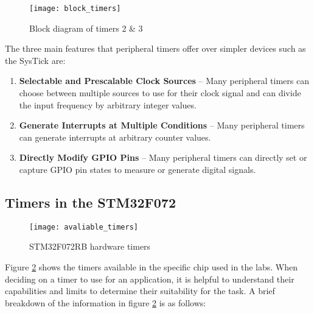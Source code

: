\documentclass[openany,11pt,fleqn]{book} %
\begin{document}
        \begin{figure}[]
            \centering\texttt{[image: block\_timers]}
            \caption{Block diagram of timers 2 \& 3}
            \label{block_timers}
        \end{figure}
        
        The three main features that peripheral timers offer over simpler devices such as the SysTick are:
        \begin{enumerate}
            \item \textbf{Selectable and Prescalable Clock Sources} -- Many peripheral timers can choose between multiple sources to use for their clock signal and can divide the input frequency by arbitrary integer values. 
            \item \textbf{Generate Interrupts at Multiple Conditions} -- Many peripheral timers can generate interrupts at arbitrary counter values.
            \item \textbf{Directly Modify GPIO Pins} -- Many peripheral timers can directly set or capture GPIO pin states to measure or generate digital signals.  
        \end{enumerate}
        
	
    
    \subsection{Timers in the STM32F072}
        \begin{figure}[]
            \centering\texttt{[image: avaliable\_timers]}
            \caption{STM32F072RB hardware timers}
            \label{avaliable_timers}
        \end{figure}
        
        
        Figure \ref{avaliable_timers} shows the timers available in the specific chip used in the labs. When deciding on a timer to use for an application, it is helpful to understand their capabilities and limits to determine their suitability for the task. A brief breakdown of the information in figure \ref{avaliable_timers} is as follows:
        
\end{document}
